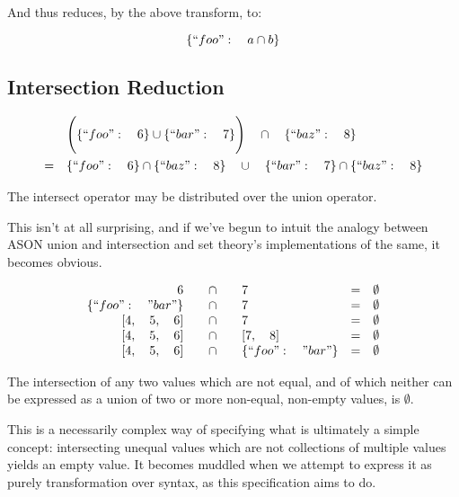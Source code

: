 \documentclass[letterpaper]{article}
\begin{document}
And thus reduces, by the above transform, to:

\begin{equation}
\{``foo":\quad a\cap b\}
\end{equation}

\subsection{Intersection Reduction}

\begin{prule}
\begin{equation}
\begin{split}
& \Bigg( \{``foo":\quad6\} \cup \{``bar":\quad7\} \Bigg) \quad \cap \quad
\{``baz":\quad8\} \\
= \quad& \{``foo":\quad6\} \cap \{``baz":\quad8\} \quad \cup \quad \{``bar":\quad7\}
 \cap \{``baz":\quad8\}
\end{split}
\end{equation}

The intersect operator may be distributed over the union operator.
\end{prule}

This isn't at all surprising, and if we've begun to intuit the analogy between
ASON union and intersection and set theory's implementations of the same, it
becomes obvious.

\begin{prule}
\label{sec:interelim}
\begin{equation}
\begin{array}{rclcl}
6 \quad&\cap&\quad 7 & = & \emptyset \\
\{``foo":\quad"bar"\} \quad&\cap&\quad 7 & = & \emptyset \\
{[}4,\quad5,\quad6] \quad&\cap&\quad 7 & = & \emptyset \\
{[}4,\quad5,\quad6] \quad&\cap&\quad {[}7,\quad8] & = & \emptyset \\
{[}4,\quad5,\quad6] \quad&\cap&\quad \{``foo":\quad"bar"\} & = & \emptyset \\
\end{array}
\end{equation}

The intersection of any two values which are not equal, and of which neither
can be expressed as a union of two or more non-equal, non-empty values, is
\(\emptyset\).
\end{prule}

This is a necessarily complex way of specifying what is ultimately a simple
concept: intersecting unequal values which are not collections of multiple
values yields an empty value. It becomes muddled when we attempt to express it
as purely transformation over syntax, as this specification aims to do.
\end{document}
